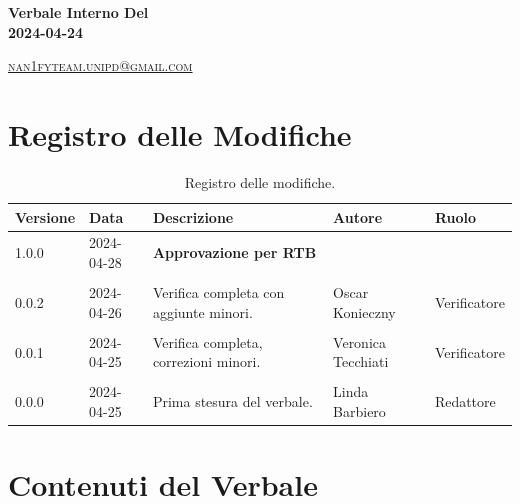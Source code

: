 \documentclass[8pt]{article}
\begin{document}
\begin{titlepage}
\begin{minipage}[t]{0.47\textwidth}
{		}
		\vspace{4mm}\vspace{4mm}
	\end{minipage}
	\vspace{4cm}
	\begin{center}
		\begin{flushright}
			{\fontsize{30pt}{52pt}\selectfont \textbf{Verbale Interno Del\\2024-04-24\\}} %
		\end{flushright}
		\vspace{3cm}
	\end{center}
	\vspace{8 cm}
	{\small \textsc{\href{mailto: nan1fyteam.unipd@gmail.com}{nan1fyteam.unipd@gmail.com}}}
\end{titlepage}
\pagestyle{mystyle}
\section*{Registro delle Modifiche}
\begin{table}[ht!]	
	\centering
	\begin{tabular}{p{1.2cm} p{2cm} p{6cm} p{3cm} p{2cm}}
		\toprule
		\textbf{Versione}& \textbf{Data} & \textbf{Descrizione} & \textbf{Autore} & \textbf{Ruolo} \\
		\midrule
  			1.0.0 & 2024-04-28 & \textbf{Approvazione per RTB} & & \\\\
			0.0.2 & 2024-04-26 & Verifica completa con aggiunte minori. & Oscar Konieczny & Verificatore \\\\
			0.0.1 & 2024-04-25 & Verifica completa, correzioni minori. & Veronica Tecchiati & Verificatore \\\\
			0.0.0 & 2024-04-25 & Prima stesura del verbale. & Linda Barbiero & Redattore \\
		\bottomrule
	\end{tabular}
	\caption{Registro delle modifiche.}
	\label{table:Registro delle modifiche}
\end{table}
\newpage
\tableofcontents
\clearpage
\newpage
\justifying
\section{Contenuti del Verbale}
\end{document}
